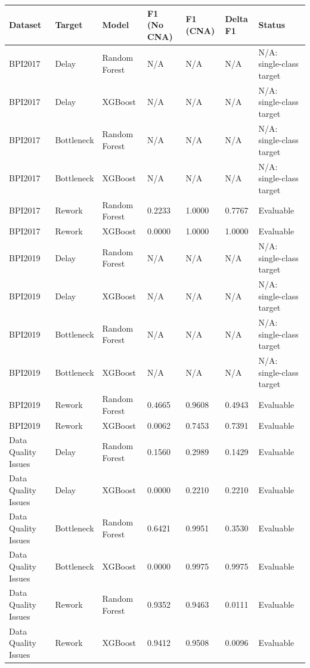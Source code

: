 \begin{tabular}{lllllll}
\toprule
Dataset & Target & Model & F1 (No CNA) & F1 (CNA) & Delta F1 & Status \\
\midrule
BPI2017 & Delay & Random Forest & N/A & N/A & N/A & N/A: single-class target \\
BPI2017 & Delay & XGBoost & N/A & N/A & N/A & N/A: single-class target \\
BPI2017 & Bottleneck & Random Forest & N/A & N/A & N/A & N/A: single-class target \\
BPI2017 & Bottleneck & XGBoost & N/A & N/A & N/A & N/A: single-class target \\
BPI2017 & Rework & Random Forest & 0.2233 & 1.0000 & 0.7767 & Evaluable \\
BPI2017 & Rework & XGBoost & 0.0000 & 1.0000 & 1.0000 & Evaluable \\
BPI2019 & Delay & Random Forest & N/A & N/A & N/A & N/A: single-class target \\
BPI2019 & Delay & XGBoost & N/A & N/A & N/A & N/A: single-class target \\
BPI2019 & Bottleneck & Random Forest & N/A & N/A & N/A & N/A: single-class target \\
BPI2019 & Bottleneck & XGBoost & N/A & N/A & N/A & N/A: single-class target \\
BPI2019 & Rework & Random Forest & 0.4665 & 0.9608 & 0.4943 & Evaluable \\
BPI2019 & Rework & XGBoost & 0.0062 & 0.7453 & 0.7391 & Evaluable \\
Data Quality Issues & Delay & Random Forest & 0.1560 & 0.2989 & 0.1429 & Evaluable \\
Data Quality Issues & Delay & XGBoost & 0.0000 & 0.2210 & 0.2210 & Evaluable \\
Data Quality Issues & Bottleneck & Random Forest & 0.6421 & 0.9951 & 0.3530 & Evaluable \\
Data Quality Issues & Bottleneck & XGBoost & 0.0000 & 0.9975 & 0.9975 & Evaluable \\
Data Quality Issues & Rework & Random Forest & 0.9352 & 0.9463 & 0.0111 & Evaluable \\
Data Quality Issues & Rework & XGBoost & 0.9412 & 0.9508 & 0.0096 & Evaluable \\
\bottomrule
\end{tabular}
